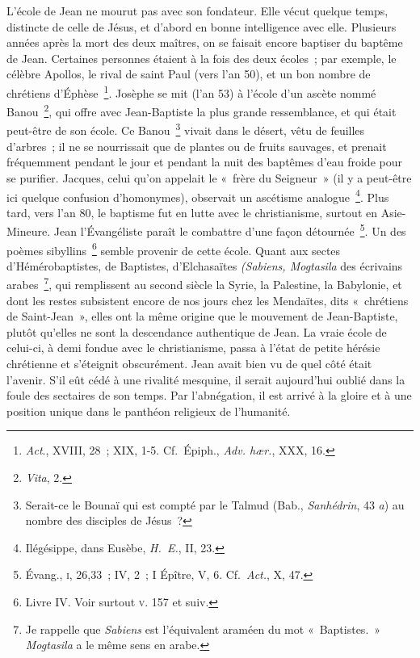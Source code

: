 \documentclass[french,twoside]{book} %
\newcommand\chapterclose{} %
\begin{document}
L’école de Jean ne mourut pas avec son fondateur. Elle vécut quelque temps, distincte de celle de Jésus, et d’abord en bonne intelligence avec elle. Plusieurs années après la mort des deux maîtres, on se faisait encore baptiser du baptême de Jean. Certaines personnes étaient à la fois des deux écoles ; par exemple, le célèbre Apollos, le rival de saint Paul (vers l’an 50), et un bon nombre de chrétiens d’Éphèse \footnote{{\itshape Act}., XVIII, 28 ; XIX, 1-5. Cf. Épiph., {\itshape Adv. hær.}, XXX, 16.}. Josèphe se mit (l’an 53) à l’école d’un ascète nommé Banou \footnote{{\itshape Vita}, 2.}, qui offre avec Jean-Baptiste la plus grande ressemblance, et qui était peut-être de son école. Ce Banou \footnote{ Serait-ce le Bounaï qui est compté par le Talmud (Bab., {\itshape Sanhédrin}, 43 {\itshape a}) au nombre des disciples de Jésus ?} vivait dans le désert, vêtu de feuilles d’arbres ; il ne se nourrissait que de plantes ou de fruits sauvages, et prenait fréquemment pendant le jour et pendant la nuit des baptêmes d’eau froide pour se purifier. Jacques, celui qu’on appelait le « frère du Seigneur » (il y a peut-être ici quelque confusion d’homonymes), observait un ascétisme analogue \footnote{ Ilégésippe, dans Eusèbe, {\itshape H. E.}, II, 23.}. Plus tard, vers l’an 80, le baptisme fut en lutte avec le christianisme, surtout en Asie-Mineure. Jean l’Évangéliste paraît le combattre d’une façon détournée \footnote{ Évang., \textsc{i}, 26,33 ; IV, 2 ; I Épître, V, 6. Cf. {\itshape Act.}, X, 47.}. Un des poèmes sibyllins \footnote{ Livre IV. Voir surtout \textsc{v}. 157 et suiv.} semble provenir de cette école. Quant aux sectes d’Hémérobaptistes, de Baptistes, d’Elchasaïtes {\itshape (Sabiens, Mogtasila} des écrivains arabes \footnote{ Je rappelle que {\itshape Sabiens} est l’équivalent araméen du mot « Baptistes. » {\itshape Mogtasila} a le même sens en arabe.}, qui remplissent au second siècle la Syrie, la Palestine, la Babylonie, et dont les restes subsistent encore de nos jours chez les Mendaïtes, dits « chrétiens de Saint-Jean », elles ont la même origine que le mouvement de Jean-Baptiste, plutôt qu’elles ne sont la descendance authentique de Jean. La vraie école de celui-ci, à demi fondue avec le christianisme, passa à l’état de petite hérésie chrétienne et s’éteignit obscurément. Jean avait bien vu de quel côté était l’avenir. S’il eût cédé à une rivalité mesquine, il serait aujourd’hui oublié dans la foule des sectaires de son temps. Par l’abnégation, il est arrivé à la gloire et à une position unique dans le panthéon religieux de l’humanité.
\chapterclose
\end{document}
